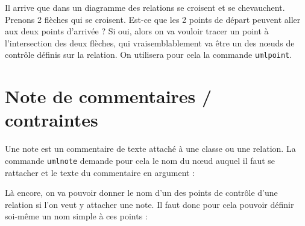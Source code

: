 \documentclass[a4paper,11pt]{report}
\newcommand{\inputTikZ}[1]{%
  }%
\newcommand{\inputTikZ}[1]{%
    \texttt{[image: fig/\#1.pdf]}%
  }%
\begin{document}
Il arrive que dans un diagramme des relations se croisent et se chevauchent. Prenons 2 flèches qui se croisent. Est-ce que les 2 points de départ peuvent aller aux deux points d'arrivée ? Si oui, alors on va vouloir tracer un point à l'intersection des deux flèches, qui vraisemblablement va être un des n\oe{}uds de contrôle définis sur la relation. On utilisera pour cela la commande {\tt umlpoint}.

\medskip

\begin{minipage}{0.5\textwidth}

\end{minipage}
\begin{minipage}{0.4\textwidth}
\begin{center}
\inputTikZ{point}
\end{center}
\end{minipage}

\section{Note de commentaires / contraintes}\label{s.note}

Une note est un commentaire de texte attaché à une classe ou une relation. La commande {\tt umlnote} demande pour cela le nom du n\oe{}ud auquel il faut se rattacher et le texte du commentaire en argument :

\medskip

\begin{minipage}{0.5\textwidth}

\end{minipage}
\begin{minipage}{0.4\textwidth}
\begin{center}
\inputTikZ{noteclass}
\end{center}
\end{minipage}

\medskip

Là encore, on va pouvoir donner le nom d'un des points de contrôle d'une relation si l'on veut y attacher une note. Il faut donc pour cela pouvoir définir soi-même un nom simple à ces points :

\medskip

\begin{minipage}{0.6\textwidth}

\end{minipage}
\begin{minipage}{0.4\textwidth}
\begin{center}
\inputTikZ{noterelation}
\end{center}
\end{minipage}
\end{document}
